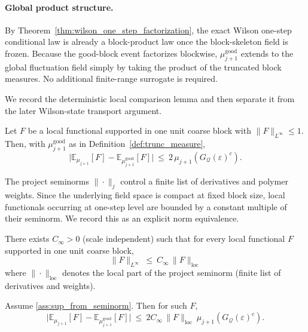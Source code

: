 \paragraph{Global product structure.}
By Theorem~\ref{thm:wilson_one_step_factorization}, the exact Wilson one-step conditional law is already a block-product law once the block-skeleton field is frozen.  Because the good-block event factorizes blockwise, $\mu_{j+1}^{\mathrm{good}}$ extends to the global fluctuation field simply by taking the product of the truncated block measures.  No additional finite-range surrogate is required.

We record the deterministic local comparison lemma and then separate it from the later Wilson-state transport argument.

\begin{lemma}\label{lem:exp_diff}
Let $F$ be a local functional supported in one unit coarse block with $\|F\|_{L^\infty}\le 1$.
Then, with $\mu_{j+1}^{\mathrm{good}}$ as in Definition~\ref{def:trunc_measure},
\[
\big|\mathbb E_{\mu_{j+1}}[F]-\mathbb E_{\mu_{j+1}^{\mathrm{good}}}[F]\big|
\ \le\ 2\,\mu_{j+1}(G_{\mathcal Q}(\varepsilon)^c).
\]
\end{lemma}

The project seminorms $\|\cdot\|_j$ control a finite list of derivatives and polymer weights.
Since the underlying field space is compact at fixed block size, local functionals occurring at one-step level are bounded by a constant multiple of their seminorm.
We record this as an explicit norm equivalence.

\begin{proposition}\label{ass:sup_from_seminorm}
There exists $C_{\infty}>0$ (scale independent) such that for every local functional $F$ supported in one unit coarse block,
\[
\|F\|_{L^\infty}\ \le\ C_{\infty}\,\|F\|_{\mathrm{loc}}
\]
where $\|\cdot\|_{\mathrm{loc}}$ denotes the local part of the project seminorm (finite list of derivatives and weights).
\end{proposition}

\begin{corollary}\label{cor:trunc_seminorm}
Assume \ref{ass:sup_from_seminorm}. Then for such $F$,
\[
\big|\mathbb E_{\mu_{j+1}}[F]-\mathbb E_{\mu_{j+1}^{\mathrm{good}}}[F]\big|
\ \le\ 2C_\infty\,\|F\|_{\mathrm{loc}}\ \mu_{j+1}(G_{\mathcal Q}(\varepsilon)^c).
\]
\end{corollary}

